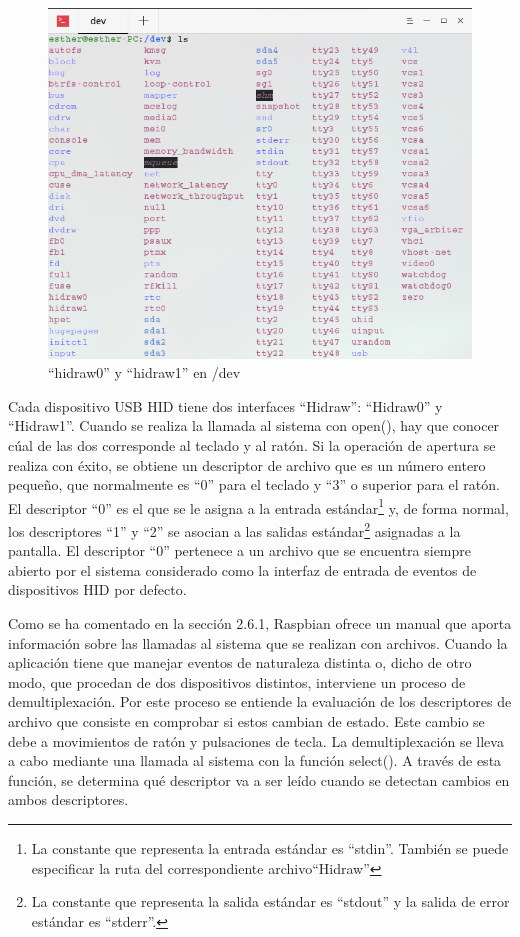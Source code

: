 \begin{figure}
\centering
\includegraphics[scale = 0.4]{capitulo_03/figuras_dir/dev.jpg}
\caption{``hidraw0'' y ``hidraw1'' en /dev}
\end{figure}

Cada dispositivo USB HID tiene dos interfaces ``Hidraw'': ``Hidraw0'' y ``Hidraw1''. Cuando se realiza la llamada al sistema con open(), hay que conocer cúal de las dos corresponde al teclado y al ratón. Si la operación de apertura se realiza con éxito, se obtiene un descriptor de archivo que es un número entero pequeño, que normalmente es ``0'' para el teclado y ``3'' o superior para el ratón. El descriptor ``0'' es el que se le asigna a la  entrada estándar\footnote{La constante que representa la entrada estándar es ``stdin''. También se puede especificar la ruta del correspondiente archivo``Hidraw''} y, de forma normal, los descriptores ``1'' y ``2'' se asocian a las salidas estándar\footnote{La constante que representa la salida estándar es ``stdout'' y la salida de error estándar es ``stderr''.} asignadas a la pantalla. El descriptor ``0'' pertenece a un archivo que se encuentra siempre abierto por el sistema considerado como la interfaz de entrada de eventos de dispositivos HID por defecto.

Como se ha comentado en la sección 2.6.1, Raspbian ofrece un manual que aporta información sobre las llamadas al sistema que se realizan con archivos. Cuando la aplicación tiene que manejar eventos de naturaleza distinta o, dicho de otro modo, que procedan de dos dispositivos distintos, interviene un proceso de demultiplexación. Por este proceso se entiende la evaluación de los descriptores de archivo que consiste en comprobar si estos cambian de estado. Este cambio se debe a movimientos de ratón y pulsaciones de tecla. La demultiplexación se lleva a cabo mediante una llamada al sistema con la función select(). A través de esta función, se determina qué descriptor va a ser leído cuando se detectan cambios en ambos descriptores.

